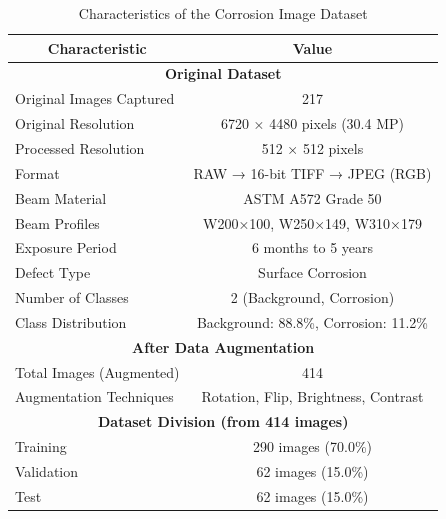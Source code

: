 \documentclass[Journal,letterpaper]{ascelike-new}
\begin{document}
\begin{table}[htbp]
\caption{Characteristics of the Corrosion Image Dataset}
\label{tab:dataset_characteristics}
\centering
\small
\renewcommand{\arraystretch}{1.25}
\begin{tabular}{l c}
\hline\hline
\multicolumn{1}{c}{\textbf{Characteristic}} & 
\multicolumn{1}{c}{\textbf{Value}} \\
\hline
\multicolumn{2}{c}{\textbf{Original Dataset}} \\
\hline
Original Images Captured & 217 \\
Original Resolution & 6720 × 4480 pixels (30.4 MP) \\
Processed Resolution & 512 × 512 pixels \\
Format & RAW → 16-bit TIFF → JPEG (RGB) \\
Beam Material & ASTM A572 Grade 50 \\
Beam Profiles & W200×100, W250×149, W310×179 \\
Exposure Period & 6 months to 5 years \\
Defect Type & Surface Corrosion \\
Number of Classes & 2 (Background, Corrosion) \\
Class Distribution & Background: 88.8\%, Corrosion: 11.2\% \\
\hline
\multicolumn{2}{c}{\textbf{After Data Augmentation}} \\
\hline
Total Images (Augmented) & 414 \\
Augmentation Techniques & Rotation, Flip, Brightness, Contrast \\
\hline
\multicolumn{2}{c}{\textbf{Dataset Division (from 414 images)}} \\
\hline
Training & 290 images (70.0\%) \\
Validation & 62 images (15.0\%) \\
Test & 62 images (15.0\%) \\
\hline\hline
\end{tabular}
\normalsize
\end{table}
\end{document}

